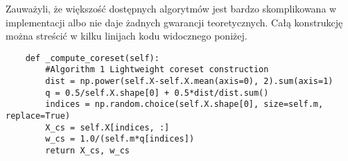 Zauważyli, że większość dostępnych algorytmów jest bardzo skomplikowana w implementacji albo nie daje żadnych gwarancji teoretycznych.
Całą konstrukcję można streścić w kilku linijach kodu widocznego poniżej.
\\
\lstset{language=Python}
\begin{lstlisting}
    def _compute_coreset(self):
        #Algorithm 1 Lightweight coreset construction
        dist = np.power(self.X-self.X.mean(axis=0), 2).sum(axis=1)
        q = 0.5/self.X.shape[0] + 0.5*dist/dist.sum()
        indices = np.random.choice(self.X.shape[0], size=self.m, replace=True)
        X_cs = self.X[indices, :]
        w_cs = 1.0/(self.m*q[indices])
        return X_cs, w_cs
\end{lstlisting}